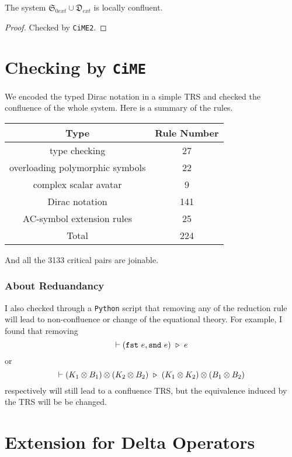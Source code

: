 \begin{proposition}
  The system $\mathfrak{S}_{0ext} \cup \mathfrak{D}_{ext}$ is locally confluent.
\end{proposition}
\begin{proof}
  Checked by \texttt{CiME2}.
\end{proof}

\section{Checking by \texttt{CiME}}

We encoded the typed Dirac notation in a simple TRS and checked the confluence of the whole system. Here is a summary of the rules.


\begin{center}
  \begin{tabular}{c|c}
  \hline
  Type & Rule Number \\
  \hline
  type checking & 27 \\
  overloading polymorphic symbols & 22 \\
  complex scalar avatar & 9 \\
  Dirac notation & 141 \\
  AC-symbol extension rules & 25 \\
  \hline
  Total & 224 \\
  \hline
  \end{tabular}
\end{center}

And all the 3133 critical pairs are joinable.

\subsubsection*{About Reduandancy}
I also checked through a \texttt{Python} script that removing any of the reduction rule will lead to non-confluence or change of the equational theory. For example, I found that removing 
$$
\vdash (\texttt{fst}\ e, \texttt{snd}\ e)\ \triangleright\  e
$$
or
$$
\vdash (K_1 \otimes B_1) \otimes (K_2 \otimes B_2) \ \triangleright\  (K_1 \otimes K_2) \otimes (B_1 \otimes B_2)
$$
respectively will still lead to a confluence TRS, but the equivalence induced by the TRS will be be changed.




\section{Extension for Delta Operators}

